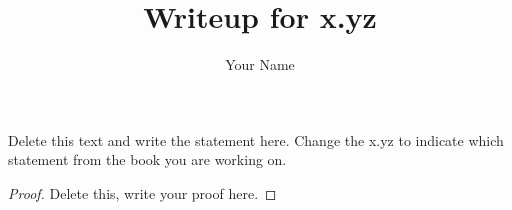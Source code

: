 \documentclass[12pt]{article}
\newenvironment{statement}[2][Statement]{\begin{trivlist}
\item[\hskip \labelsep {\bfseries #1}\hskip \labelsep {\bfseries #2.}]}{\end{trivlist}}
\begin{document}
%
%

\title{Writeup for x.yz} %
\author{Your Name} %
\maketitle


\begin{statement}{x.yz} %
	Delete this text and write the statement here. Change the x.yz to indicate which statement from the book you are working on.
\end{statement}

\begin{proof}


	Delete this, write your proof here.



\end{proof}









\end{document}
